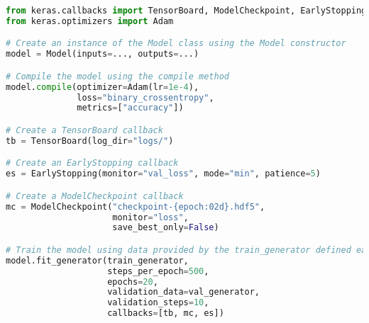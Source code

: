 \begin{lstlisting}[float={ht},caption={A simple example of compiling a Keras model using the \texttt{TensorBoard}, \texttt{EarlyStopping}, and \texttt{ModelCheckpoint} callbacks. The Keras implementations of the Adam optimiser, binary cross-entropy loss, and per-pixel accuracy are used.},label={lst:compile},language=Python,upquote=true]
from keras.callbacks import TensorBoard, ModelCheckpoint, EarlyStopping
from keras.optimizers import Adam

# Create an instance of the Model class using the Model constructor
model = Model(inputs=..., outputs=...)

# Compile the model using the compile method
model.compile(optimizer=Adam(lr=1e-4), 
              loss="binary_crossentropy",
              metrics=["accuracy"])

# Create a TensorBoard callback
tb = TensorBoard(log_dir="logs/")

# Create an EarlyStopping callback
es = EarlyStopping(monitor="val_loss", mode="min", patience=5)

# Create a ModelCheckpoint callback
mc = ModelCheckpoint("checkpoint-{epoch:02d}.hdf5",
                     monitor="loss",
                     save_best_only=False)

# Train the model using data provided by the train_generator defined earlier
model.fit_generator(train_generator, 
                    steps_per_epoch=500, 
                    epochs=20,
                    validation_data=val_generator,
                    validation_steps=10,
                    callbacks=[tb, mc, es])
\end{lstlisting}